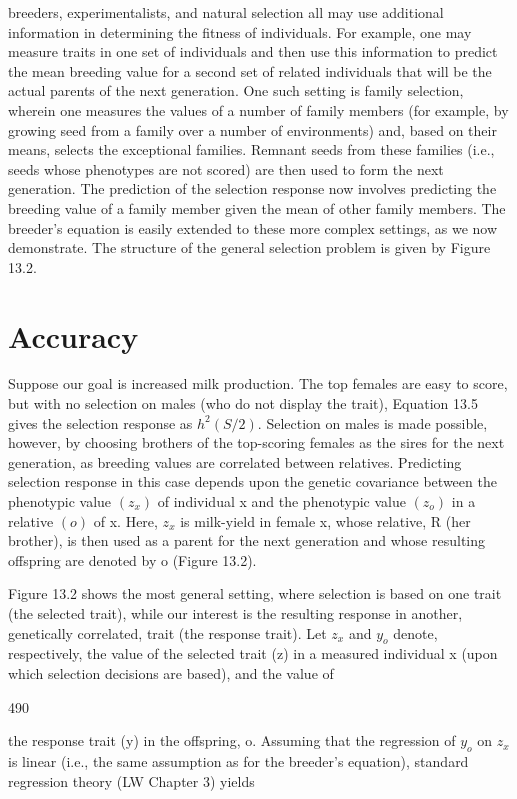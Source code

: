 \documentclass{article}
\begin{document}
breeders, experimentalists, and natural selection all may use additional information in determining the fitness of individuals. For example, one may measure traits in one set of individuals and then use this information to predict the mean breeding value for a second set of related individuals that will be the actual parents of the next generation. One such setting is family selection, wherein one measures the values of a number of family members (for example, by growing seed from a family over a number of environments) and, based on their means, selects the exceptional families. Remnant seeds from these families (i.e., seeds whose phenotypes are not scored) are then used to form the next generation. The prediction of the selection response now involves predicting the breeding value of a family member given the mean of other family members. The breeder's equation is easily extended to these more complex settings, as we now demonstrate. The structure of the general selection problem is given by Figure 13.2.

\section{Accuracy}
Suppose our goal is increased milk production. The top females are easy to score, but with no selection on males (who do not display the trait), Equation 13.5 gives the selection response as  $ h^{2}(S/2) $. Selection on males is made possible, however, by choosing brothers of the top-scoring females as the sires for the next generation, as breeding values are correlated between relatives. Predicting selection response in this case depends upon the genetic covariance between the phenotypic value  $ (z_{x}) $ of individual x and the phenotypic value  $ (z_{o}) $ in a relative  $ (o) $ of x. Here,  $ z_{x} $ is milk-yield in female x, whose relative, R (her brother), is then used as a parent for the next generation and whose resulting offspring are denoted by o (Figure 13.2).

Figure 13.2 shows the most general setting, where selection is based on one trait (the selected trait), while our interest is the resulting response in another, genetically correlated, trait (the response trait). Let  $ z_{x} $ and  $ y_{o} $ denote, respectively, the value of the selected trait (z) in a measured individual x (upon which selection decisions are based), and the value of

490

the response trait (y) in the offspring, o. Assuming that the regression of  $ y_{o} $ on  $ z_{x} $ is linear (i.e., the same assumption as for the breeder's equation), standard regression theory (LW Chapter 3) yields
\end{document}
